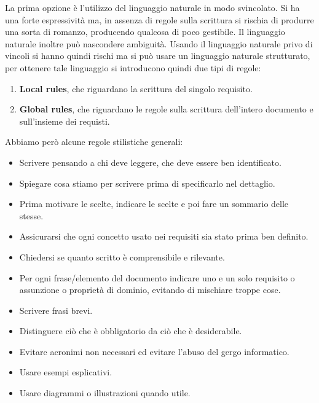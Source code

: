 La prima opzione è l'utilizzo del linguaggio naturale in modo svincolato. Si ha
una forte espressività ma, in assenza di regole sulla scrittura si rischia di
produrre una sorta di romanzo, producendo qualcosa di poco gestibile. Il linguaggio
naturale inoltre può nascondere ambiguità. Usando il linguaggio naturale privo
di vincoli si hanno quindi rischi ma si può usare un linguaggio naturale strutturato,
per ottenere tale linguaggio si introducono quindi due tipi di regole:
\begin{enumerate}
    \item \textbf{Local rules}, che riguardano la scrittura del singolo requisito.
    \item \textbf{Global rules}, che riguardano le regole sulla scrittura
          dell'intero documento e sull'insieme dei requisti.
\end{enumerate}
Abbiamo però alcune regole stilistiche generali:
\begin{itemize}
    \item Scrivere pensando a chi deve leggere, che deve essere ben identificato.
    \item Spiegare cosa stiamo per scrivere prima di specificarlo nel dettaglio.
    \item Prima motivare le scelte, indicare le scelte e poi fare un sommario delle stesse.
    \item Assicurarsi che ogni concetto usato nei requisiti sia stato prima ben definito.
    \item Chiedersi se quanto scritto è comprensibile e rilevante.
    \item Per ogni frase/elemento del documento indicare uno e un solo requisito
          o assunzione o proprietà di dominio, evitando di mischiare troppe cose.
    \item Scrivere frasi brevi.
    \item Distinguere ciò che è obbligatorio da ciò che è desiderabile.
    \item Evitare acronimi non necessari ed evitare l'abuso del gergo informatico.
    \item Usare esempi esplicativi.
    \item Usare diagrammi o illustrazioni quando utile.
\end{itemize}

